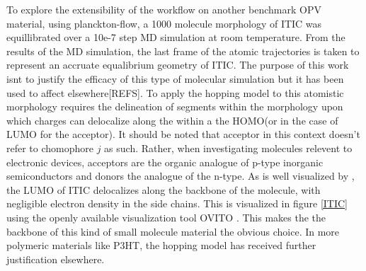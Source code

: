 To explore the extensibility of the workflow on another benchmark OPV material, using planckton-flow, a 1000
molecule morphology of ITIC was equillibrated over a 10e-7 step MD simulation at room temperature. From the results of the MD
simulation, the last frame of the atomic trajectories is taken to represent an accruate equalibrium geometry
of ITIC. The purpose of this work isnt to justify the efficacy of this type of molecular simulation but it has
been used to affect elsewhere[REFS]. To apply the hopping model to this atomistic morphology requires the
delineation of segments within the morphology upon which charges can delocalize along the within a the HOMO(or in
the case of LUMO for the acceptor). It should be noted that acceptor in this context doesn't refer to
chomophore $j$ as such. Rather, when investigating molecules relevent to electronic devices, acceptors are the
organic analogue of p-type inorganic semiconductors and donors the analogue of the n-type. 
As is well visualized by \cite{Han2019}, the LUMO of ITIC delocalizes along the backbone of the molecule, with
negligible electron density in the side chains. This is visualized in figure \ref{ITIC} using the openly
available visualization tool OVITO \cite{Stukowski2010a}. This makes the the backbone of this kind of small molecule
material the obvious choice. In more polymeric materials like P3HT, the hopping model has received further
justification elsewhere. 

